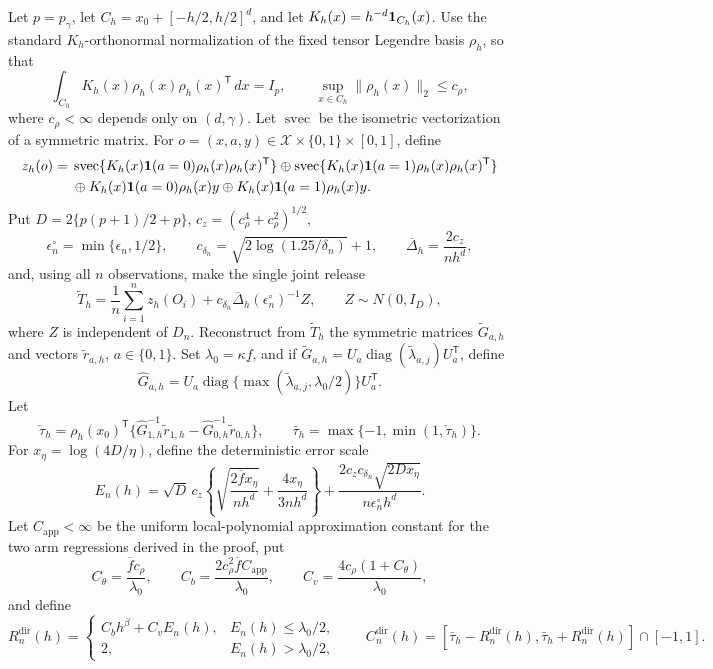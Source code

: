 Let \(p=p_\gamma\), let \(C_h=x_0+[-h/2,h/2]^d\), and let \(K_h(x)=h^{-d}{\bf1}_{C_h}(x)\).  Use the standard \(K_h\)-orthonormal normalization of the fixed tensor Legendre basis \(\rho_h\), so that
\[
 \int_{C_h}K_h(x)\rho_h(x)\rho_h(x)^{\mathsf T}\,dx=I_p,
 \qquad
 \sup_{x\in C_h}\|\rho_h(x)\|_2\le c_\rho,
\]
where \(c_\rho<\infty\) depends only on \((d,\gamma)\).  Let \(\operatorname{svec}\) be the isometric vectorization of a symmetric matrix.  For \(o=(x,a,y)\in\mathcal X\times\{0,1\}\times[0,1]\), define
\[
 \begin{aligned}
 z_h(o)={}&\operatorname{svec}\{K_h(x){\bf1}(a=0)\rho_h(x)\rho_h(x)^{\mathsf T}\}
 \mathbin\oplus
 \operatorname{svec}\{K_h(x){\bf1}(a=1)\rho_h(x)\rho_h(x)^{\mathsf T}\}\\
 &\mathbin\oplus K_h(x){\bf1}(a=0)\rho_h(x)y
 \mathbin\oplus K_h(x){\bf1}(a=1)\rho_h(x)y.
 \end{aligned}
\]
Put \(D=2\{p(p+1)/2+p\}\), \(c_z=(c_\rho^4+c_\rho^2)^{1/2}\),
\[
 \epsilon_n^\circ=\min\{\epsilon_n,1/2\},
 \qquad c_{\delta_n}=\sqrt{2\log(1.25/\delta_n)}+1,
 \qquad \overline\Delta_h=\frac{2c_z}{nh^d},
\]
and, using all \(n\) observations, make the single joint release
\[
 \widetilde T_h=\frac1n\sum_{i=1}^nz_h(O_i)
 +c_{\delta_n}\overline\Delta_h(\epsilon_n^\circ)^{-1}Z,
 \qquad Z\sim N(0,I_D),
\tag{15}
\]
where \(Z\) is independent of \(D_n\).
Reconstruct from \(\widetilde T_h\) the symmetric matrices \(\widetilde G_{a,h}\) and vectors \(\widetilde r_{a,h}\), \(a\in\{0,1\}\).  Set \(\lambda_0=\kappa\underline f\), and if
\(\widetilde G_{a,h}=U_a\operatorname{diag}(\widetilde\lambda_{a,j})U_a^{\mathsf T}\), define
\[
 \widehat G_{a,h}=U_a\operatorname{diag}\{\max(\widetilde\lambda_{a,j},\lambda_0/2)\}U_a^{\mathsf T}.
\]
Let
\[
 \check\tau_h=\rho_h(x_0)^{\mathsf T}
 \{\widehat G_{1,h}^{-1}\widetilde r_{1,h}
   -\widehat G_{0,h}^{-1}\widetilde r_{0,h}\},
 \qquad
 \bar\tau_h=\max\{-1,\min(1,\check\tau_h)\}.
\]
For \(x_\eta=\log(4D/\eta)\), define the deterministic error scale
\[
 E_n(h)=\sqrt D\,c_z\left\{
 \sqrt{\frac{2\overline f x_\eta}{nh^d}}+
 \frac{4x_\eta}{3nh^d}\right\}
 +\frac{2c_zc_{\delta_n}\sqrt{2Dx_\eta}}
 {n\epsilon_n^\circ h^d}.
\tag{16}
\]
Let \(C_{\mathrm{app}}<\infty\) be the uniform local-polynomial approximation constant for the two arm regressions derived in the proof, put
\[
 C_\theta=\frac{\overline f c_\rho}{\lambda_0},
 \qquad
 C_b=\frac{2c_\rho^2\overline f C_{\mathrm{app}}}{\lambda_0},
 \qquad
 C_v=\frac{4c_\rho(1+C_\theta)}{\lambda_0},
\]
and define
\[
 R_n^{\mathrm{dir}}(h)=
 \begin{cases}
 C_bh^\beta+C_vE_n(h),&E_n(h)\le\lambda_0/2,\\
 2,&E_n(h)>\lambda_0/2,
 \end{cases}
 \qquad
 C_n^{\mathrm{dir}}(h)=
 [\bar\tau_h-R_n^{\mathrm{dir}}(h),\bar\tau_h+R_n^{\mathrm{dir}}(h)]\cap[-1,1].
\tag{17}
\]
